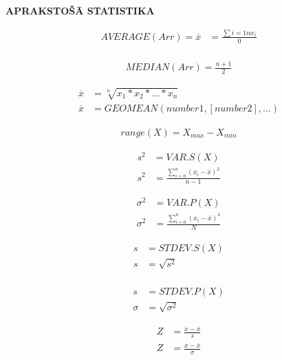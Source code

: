 \textbf{APRAKSTOŠĀ STATISTIKA}

{\begin{align*}
     AVERAGE(Arr) = \overline{x} &= \frac{\sum{i=1}{n}x_i}{0} \\
\end{align*}}

{\begin{align*}
    MEDIAN(Arr) = \frac{n+1}{2}
\end{align*}}

{\begin{align*}
    \overline{x} &= \sqrt[n]{x_1*x_2*\dots*x_n} \\
    \overline{x} &= GEOMEAN(number1, [number2], ...)
\end{align*}}

{\begin{align*}
    range(X)=X_{max}-X_{min}
\end{align*}}

{\begin{align*}
    s^2 &= VAR.S(X) \\
    s^2 &= \frac{\sum_{i=0}^{n} (x_i-\overline{x})^2}{n-1}
\end{align*}}

{\begin{align*}
    \sigma^2 &= VAR.P(X) \\
    \sigma^2 &= \frac{\sum_{i=0}^{n} (x_i-\overline{x})^2}{N}
\end{align*}}

{\begin{align*}
    s &= STDEV.S(X) \\
    s &= \sqrt{s^2} \\
\end{align*}}

{\begin{align*}
    s &= STDEV.P(X) \\
    \sigma &= \sqrt{\sigma^2}
\end{align*}}



{\begin{align*}
    Z &= \frac{x-\overline{x}}{s} \\
    Z &= \frac{x-\overline{x}}{\sigma}
\end{align*}}

